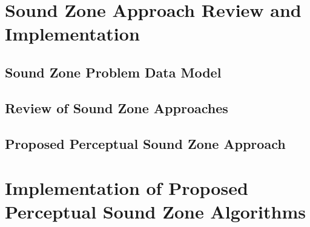 \documentclass[10pt,twoside,openright,titlepage]{ce}
\begin{document}
\chapter{Sound Zone Approach Review and Implementation}
\label{ch:sound_zone}
% 

\newpage
\section{Sound Zone Problem Data Model}
\label{ch:sound_zone:data_model}

\newpage
\section{Review of Sound Zone Approaches}
\label{ch:sound_zone:approaches}

\newpage
\section{Proposed Perceptual Sound Zone Approach}
\label{ch:sound_zone:approach_selection}

\newpage
% 

\chapter{Implementation of Proposed Perceptual Sound Zone Algorithms}
\label{ch:perceptual_sound_zone}

\newpage
\end{document}
